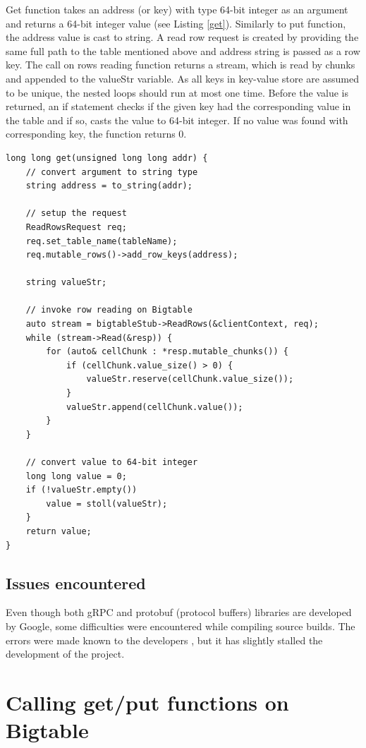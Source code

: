 \documentclass[bsc,frontabs,twoside,singlespacing,parskip,deptreport]{infthesis}     %
\begin{document}
Get function takes an address (or key) with type 64-bit integer as an argument and returns a 64-bit integer value (see Listing \ref{get}). Similarly to put function, the address value is cast to string. A read row request is created by providing the same full path to the table mentioned above and address string is passed as a row key. The call on rows reading function returns a stream, which is read by chunks and appended to the valueStr variable. As all keys in key-value store are assumed to be unique, the nested loops should run at most one time. Before the value is returned, an if statement checks if the given key had the corresponding value in the table and if so, casts the value to 64-bit integer. If no value was found with corresponding key, the function returns 0.

\begin{lstlisting}[caption=Reading content from Bigtable using get() function, label=get, style=block]
long long get(unsigned long long addr) {
	// convert argument to string type
	string address = to_string(addr);

	// setup the request
	ReadRowsRequest req;
	req.set_table_name(tableName);
	req.mutable_rows()->add_row_keys(address);
        
	string valueStr;
	
	// invoke row reading on Bigtable
	auto stream = bigtableStub->ReadRows(&clientContext, req);
	while (stream->Read(&resp)) {
		for (auto& cellChunk : *resp.mutable_chunks()) {
			if (cellChunk.value_size() > 0) {
				valueStr.reserve(cellChunk.value_size());
			}
			valueStr.append(cellChunk.value());
		}
	}
	
	// convert value to 64-bit integer
	long long value = 0;
	if (!valueStr.empty())
		value = stoll(valueStr);
	}
	return value;
}
\end{lstlisting}

\section{Issues encountered}

Even though both gRPC and protobuf (protocol buffers) libraries are developed by Google, some difficulties were encountered while compiling source builds. The errors were made known to the developers \citep{grpc_issue}, but it has slightly stalled the development of the project.

\chapter{Calling get/put functions on Bigtable}
\end{document}
